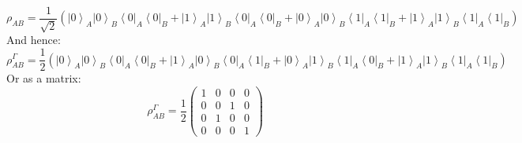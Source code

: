\documentclass[12pt,a4]{article}
\begin{document}
\begin{enumerate}
\begin{enumerate}
\begin{equation*}
          \rho_{AB} = \frac{1}{\sqrt{2}}(\left| 0\right\rangle_A\left| 0\right\rangle_B\left\langle 0\right|_A\left\langle 0\right|_B + \left| 1\right\rangle_A\left| 1\right\rangle_B\left\langle 0\right|_A\left\langle 0\right|_B + \left| 0\right\rangle_A\left| 0\right\rangle_B\left\langle 1\right|_A\left\langle 1\right|_B + \left| 1\right\rangle_A\left| 1\right\rangle_B\left\langle 1\right|_A\left\langle 1\right|_B)
        \end{equation*}
        And hence:
        \begin{equation*}
          \rho_{AB}^\Gamma = \frac{1}{2}(\left| 0\right\rangle_A\left| 0\right\rangle_B\left\langle 0\right|_A\left\langle 0\right|_B + \left| 1\right\rangle_A\left| 0\right\rangle_B\left\langle 0\right|_A\left\langle 1\right|_B + \left| 0\right\rangle_A\left| 1\right\rangle_B\left\langle 1\right|_A\left\langle 0\right|_B + \left| 1\right\rangle_A\left| 1\right\rangle_B\left\langle 1\right|_A\left\langle 1\right|_B)
        \end{equation*}
        Or as a matrix:
        \begin{equation*}
          \rho_{AB}^\Gamma = \frac{1}{2}
          \left(
            \begin{matrix}
              1 & 0 & 0 & 0\\
              0 & 0 & 1 & 0\\
              0 & 1 & 0 & 0\\
              0 & 0 & 0 & 1
            \end{matrix}
          \right)
        \end{equation*}


\end{enumerate}
\end{enumerate}
\end{document}
